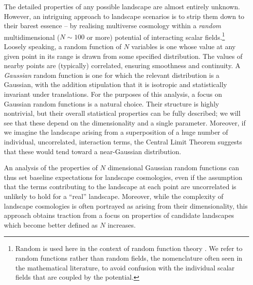 \documentclass[12pt]{article}
\begin{document}
The detailed properties of any possible landscape are almost entirely unknown.  However, an intriguing approach to landscape scenarios is to strip them down to their barest essence -- by realising multiverse cosmology within a {\em random\/} multidimensional ($N\sim100$ or more) potential of interacting scalar fields.\footnote{Random is used here in the  context of random function theory \cite{GRF1, GRF2, GRF3}.  We refer to random functions rather than random fields, the nomenclature often seen in the mathematical literature, to avoid confusion with the individual scalar fields that are coupled by the potential.} Loosely speaking, a random function of $N$ variables is one whose value at any given point in its range is drawn from some specified distribution. The values of nearby points are (typically) correlated, ensuring smoothness and continuity. A {\em Gaussian\/} random function is one for which the relevant distribution is a Gaussian, with the addition stipulation that it is isotropic and statistically invariant under translations. For the purposes of this analysis, a focus on Gaussian random functions is a natural choice. Their structure is highly nontrivial, but their overall statistical properties can be fully described; we will see that these depend on the dimensionality and a single parameter. Moreover, if we imagine the landscape arising from a superposition of a huge number of individual, uncorrelated, interaction terms, the Central Limit Theorem suggests that these would tend toward a near-Gaussian distribution.  

An analysis of the properties of $N$ dimensional Gaussian random functions can thus set baseline expectations for landscape cosmologies, even if the assumption that the terms contributing to the landscape at each point are uncorrelated is unlikely to hold for a ``real'' landscape. Moreover, while the complexity of landscape cosmologies is often portrayed as arising from their dimensionality, this approach obtains traction from a focus on properties of candidate landscapes which become better defined as $N$ increases. 
 
\end{document}
